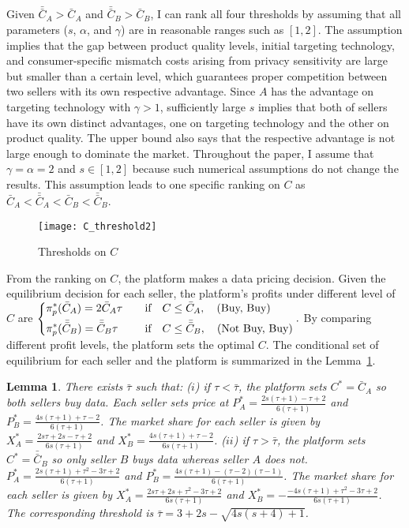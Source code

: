 \documentclass[12pt]{article}
\newtheorem{lemma}{Lemma}
\begin{document}
Given $\bar{\bar{C}}_A>\bar{C}_A$ and $\bar{\bar{C}}_B>\bar{C}_B$, I can rank all four thresholds by assuming that all parameters ($s$, $\alpha$, and $\gamma$) are in reasonable ranges such as $[1,2]$. The assumption implies that the gap between product quality levels, initial targeting technology, and consumer-specific mismatch costs arising from privacy sensitivity are large but smaller than a certain level, which guarantees proper competition between two sellers with its own respective advantage. Since $A$ has the advantage on targeting technology with $\gamma>1$, sufficiently large $s$ implies that both of sellers have its own distinct advantages, one on targeting technology and the other on product quality. The upper bound also says that the respective advantage is not large enough to dominate the market. Throughout the paper, I assume that $\gamma=\alpha=2$ and $s \in [1,2]$ because such numerical assumptions do not change the results. This assumption leads to one specific ranking on $C$ as $\bar{C}_A<\bar{\bar{C}}_A<\bar{C}_B<\bar{\bar{C}}_B$. 
\begin{figure}\centering
	\texttt{[image: C\_threshold2]} 
	\caption{Thresholds on $C$}\label{thresholdsC}
\end{figure} 
From the ranking on $C$, the platform makes a data pricing decision. Given the equilibrium decision for each seller, the platform's profits under different level of $C$ are 
$\begin{dcases}
\pi_p^*(\bar{C}_A) = 2\bar{C}_A\tau \quad &\text{if} \quad C\leq\bar{C}_A, \quad \text{(Buy, Buy)}\\
\pi_p^*(\bar{\bar{C}}_B)=\bar{\bar{C}}_B\tau \quad &\text{if} \quad C\leq\bar{\bar{C}}_B,\quad \text{(Not Buy, Buy)}
\end{dcases}.$  
By comparing different profit levels, the platform sets the optimal $C$. The conditional set of equilibrium for each seller and the platform is summarized in the Lemma~\ref{NVeqm}. 
\begin{lemma}\label{NVeqm}
	There exists $\bar{\tau}$ such that:
	($i$) if $\tau <\bar{\tau}$, the platform sets $C^*=\bar{C}_A$ so both sellers buy data. Each seller sets price at $P_A^*=\frac{2 s (\tau +1)-\tau +2}{6 (\tau +1)}$ and $P_B^*=\frac{4 s (\tau +1)+\tau -2}{6 (\tau +1)}$. The market share for each seller is given by $X_A^*=\frac{2 s \tau +2 s-\tau +2}{6 s( \tau +1)}$ and $X_B^*=\frac{4 s (\tau +1)+\tau -2}{6 s (\tau +1)}$.
	($ii$) if $\tau >\bar{\tau}$, the platform sets $C^*=\bar{\bar{C}}_B$ so only seller $B$ buys data whereas seller $A$ does not. $P_A^*=\frac{2 s (\tau +1)+\tau ^2-3 \tau +2}{6  (\tau +1)}$ and $P_B^*=\frac{4 s (\tau +1)-(\tau -2) (\tau -1)}{6  (\tau +1)}$. The market share for each seller is given by $X_A^*=\frac{2 s \tau +2 s+\tau ^2-3 \tau +2}{6 s (\tau +1)}$ and $X_B^*=-\frac{-4 s (\tau +1)+\tau ^2-3 \tau +2}{6 s (\tau +1)}$.
	The corresponding threshold is $\bar{\tau} = 3+2 s-\sqrt{4 s (s+4)+1}$.
\end{lemma}
\end{document}
